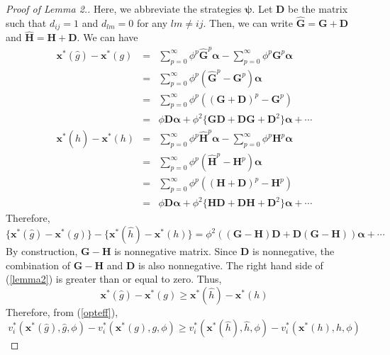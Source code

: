 \documentclass[12pt]{article}
\theoremstyle{definition}
\begin{document}
\begin{proof}[Proof of Lemma 2.]
	Here, we abbreviate the strategies $\bm{\psi}$.
	Let $\bm{D}$ be the matrix such that $d_{ij} = 1$ and $d_{lm} = 0$ for any $lm \neq ij$.
	Then, we can write $\bm{\hat{G}} = \bm{G} + \bm{D}$ and $\bm{\hat{H}} = \bm{H} + \bm{D}$.
	We can have
	\begin{eqnarray*}
		\bm{x}^*(\hat{g}) - \bm{x}^*(g)
			&=& \sum_{p=0}^{\infty} \phi^p \bm{\hat{G}}^p \bm{\alpha} - \sum_{p=0}^{\infty} \phi^p \bm{G}^p \bm{\alpha} \\
			&=& \sum_{p=0}^{\infty} \phi^p (\bm{\hat{G}}^p - \bm{G}^p) \bm{\alpha} \\
			&=& \sum_{p=0}^{\infty} \phi^p ({(\bm{G} + \bm{D})}^p - \bm{G}^p) \\
			&=& \phi \bm{D} \bm{\alpha} + \phi^2 \{ \bm{G} \bm{D} + \bm{D} \bm{G} + \bm{D}^2 \} \bm{\alpha} + \cdots \\
		\bm{x}^*(\hat{h}) - \bm{x}^*(h)
			&=& \sum_{p=0}^{\infty} \phi^p \bm{\hat{H}}^p \bm{\alpha} - \sum_{p=0}^{\infty} \phi^p \bm{H}^p \bm{\alpha} \\
			&=& \sum_{p=0}^{\infty} \phi^p (\bm{\hat{H}}^p - \bm{H}^p) \bm{\alpha} \\
			&=& \sum_{p=0}^{\infty} \phi^p ({(\bm{H} + \bm{D})}^p - \bm{H}^p) \\
			&=& \phi \bm{D} \bm{\alpha} + \phi^2 \{ \bm{H} \bm{D} + \bm{D} \bm{H} + \bm{D}^2 \} \bm{\alpha} + \cdots
	\end{eqnarray*}
	Therefore,
	\begin{equation}
		\label{lemma2}
		\{ \bm{x}^*(\hat{g}) - \bm{x}^*(g) \} - \{ \bm{x}^*(\hat{h}) - \bm{x}^*(h) \} = \phi^2 ((\bm{G} - \bm{H}) \bm{D} + \bm{D} (\bm{G} - \bm{H})) \bm{\alpha} + \cdots
	\end{equation}
	By construction, $\bm{G} - \bm{H}$ is nonnegative matrix.
	Since $\bm{D}$ is nonnegative, the combination of $\bm{G} - \bm{H}$ and $\bm{D}$ is also nonnegative.
	The right hand side of (\ref{lemma2}) is greater than or equal to zero.
	Thus,
	\[ \bm{x}^*(\hat{g}) - \bm{x}^*(g) \ge \bm{x}^*(\hat{h}) - \bm{x}^*(h) \]
	Therefore, from (\ref{opteff}),
	\[ v_i^*(\bm{x}^*(\hat{g}), \hat{g}, \phi) - v_i^*(\bm{x}^*(g), g, \phi) \ge v_i^*(\bm{x}^*(\hat{h}), \hat{h}, \phi) - v_i^*(\bm{x}^*(h), h, \phi)\]
\end{proof}
\end{document}
